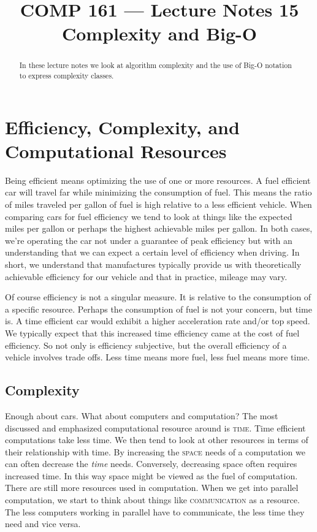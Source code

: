 \documentclass[]{tufte-handout}
\title{COMP 161 --- Lecture Notes 15 \\ Complexity and Big-O}
\date{}
\begin{document}
\maketitle

\begin{abstract}
In these lecture notes we look at algorithm complexity and the use of Big-O notation to express complexity classes.
\end{abstract}

\section{Efficiency, Complexity, and Computational Resources}

Being efficient means optimizing the use of one or more resources.  A fuel efficient car will travel far while minimizing the consumption of fuel. This means the ratio of miles traveled per gallon of fuel is high relative to a less efficient vehicle.  When comparing cars for fuel efficiency we tend to look at things like the expected miles per gallon or perhaps the highest achievable miles per gallon. In both cases, we're operating the car not under a guarantee of peak efficiency but with an understanding that we can expect a certain level of efficiency when driving. In short, we understand that manufactures typically provide us with theoretically achievable efficiency for our vehicle and that in practice, mileage may vary.

Of course efficiency is not a singular measure. It is relative to the consumption of a specific resource.  Perhaps the consumption of fuel is not your concern, but time is.  A time efficient car would exhibit a higher acceleration rate and/or top speed.  We typically expect that this increased time efficiency came at the cost of fuel efficiency. So not only is efficiency subjective, but the overall efficiency of a vehicle involves trade offs.  Less time means more fuel, less fuel means more time.

\subsection{Complexity}

Enough about cars. What about computers and computation? The most discussed and emphasized computational resource around is \textsc{time}. Time efficient computations take less time.  We then tend to look at other resources in terms of their relationship with time. By increasing the \textsc{space} needs of a computation we can often decrease the \textit{time} needs.  Conversely, decreasing space often requires increased time. In this way space might be viewed as the fuel of computation. There are still more resources used in computation. When we get into parallel computation, we start to think about things like \textsc{communication} as a resource.  The less computers working in parallel have to communicate, the less time they need and vice versa.
\end{document}
